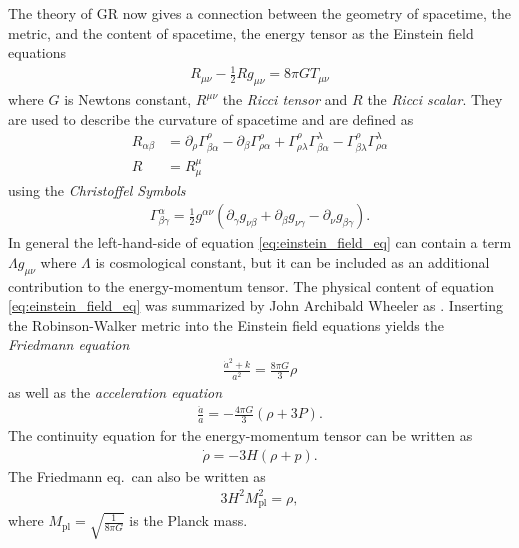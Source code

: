 \documentclass[twoside,a4paper, 12pt]{article}
\numberwithin{equation}{section}
\begin{document}
\noindent
The theory of GR now gives a connection between the geometry of spacetime,
the metric, and the content of spacetime, the energy tensor as the
Einstein field equations \cite[Eq. 3.1]{TheEarlyUniverseKolbAndTurner}
\begin{align}
    \label{eq:einstein_field_eq}
    R_{\mu \nu} - \frac{1}{2} R g_{\mu \nu} = 8 \pi G T_{\mu\nu}
\end{align}
where $G$ is Newtons constant, $R^{\mu \nu}$ the \emph{Ricci tensor} and $R$ the \emph{Ricci scalar}. They are used to describe the
curvature of spacetime and are defined as \cite[Eq. 92.7]{Landau}
\begin{align}
    \label{eq:ricci}
    R_{\alpha \beta} &= \partial_\rho \Gamma^\rho_{\beta \alpha} - \partial_\beta \Gamma^\rho_{\rho \alpha} + \Gamma^\rho_{\rho \lambda} \Gamma^\lambda_{\beta \alpha} - \Gamma^\rho_{\beta \lambda} \Gamma^\lambda_{\rho \alpha} \\
    R &= R^\mu_\mu
\end{align}
using the \emph{Christoffel Symbols} \cite[Eq. 86.3]{Landau}
\begin{align}
    \Gamma^\alpha_{\beta \gamma} = \frac{1}{2} g^{\alpha \nu} \left( \partial_\gamma g_{\nu \beta} + \partial_\beta g_{\nu \gamma} - \partial_\nu g_{\beta \gamma} \right).
\end{align}
In general the left-hand-side of equation \eqref{eq:einstein_field_eq} can contain a term $\Lambda g_{\mu \nu}$
where $\Lambda$ is cosmological constant, but it can be included as an additional
contribution to the energy-momentum tensor.
The physical content of equation \eqref{eq:einstein_field_eq} was summarized
by John Archibald Wheeler as
 \cite[P. 5, left ]{Gravitation}.
Inserting the Robinson-Walker metric into the Einstein field equations yields
the \emph{Friedmann equation} \cite[Eq. 3.10]{TheEarlyUniverseKolbAndTurner}
\begin{align}
    \label{eq:friedmann_eq}
    \frac{\dot{a}^2 + k}{a^2} = \frac{8 \pi G}{3} \rho
\end{align}
as well as
the \emph{acceleration equation} \cite[Eq. 3.11]{TheEarlyUniverseKolbAndTurner}
\begin{align}
    \label{eq:accelaration_eq}
    \frac{\ddot{a}}{a} = - \frac{4 \pi G}{3} \left( \rho + 3 P \right).
\end{align}
The continuity equation for the energy-momentum tensor can be written as
\begin{align}
    \label{eq:cont}
   \dot{\rho} = - 3 H \left( \rho + p \right).
\end{align}
The Friedmann eq.\ can also be written as \cite[Sec. 1.3.3, Eq. 1.67]{CosmologyBookMukhanov}
\begin{align}
    \label{eq:friedmann_equation}
    3 H^2 M^2_\mathrm{pl} = \rho,
\end{align}
where $M_\mathrm{pl} = \sqrt{\frac{1}{8 \pi G}}$
is the Planck mass.
\end{document}
